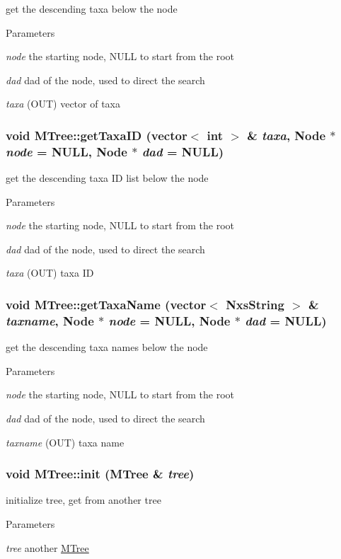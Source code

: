 get the descending taxa below the node 
\begin{DoxyParams}{Parameters}
\item[{\em node}]the starting node, NULL to start from the root \item[{\em dad}]dad of the node, used to direct the search \item[{\em taxa}](OUT) vector of taxa \end{DoxyParams}
\hypertarget{classMTree_ab0f71f4d94294490f3afe53873d394b5}{
\subsubsection[{getTaxaID}]{\setlength{\rightskip}{0pt plus 5cm}void MTree::getTaxaID (vector$<$ int $>$ \& {\em taxa}, \/  {\bf Node} $\ast$ {\em node} = {\ttfamily NULL}, \/  {\bf Node} $\ast$ {\em dad} = {\ttfamily NULL})}}
\label{classMTree_ab0f71f4d94294490f3afe53873d394b5}
get the descending taxa ID list below the node 
\begin{DoxyParams}{Parameters}
\item[{\em node}]the starting node, NULL to start from the root \item[{\em dad}]dad of the node, used to direct the search \item[{\em taxa}](OUT) taxa ID \end{DoxyParams}
\hypertarget{classMTree_a7552f9cfb570e529ba25a4d6f223ea16}{
\subsubsection[{getTaxaName}]{\setlength{\rightskip}{0pt plus 5cm}void MTree::getTaxaName (vector$<$ {\bf NxsString} $>$ \& {\em taxname}, \/  {\bf Node} $\ast$ {\em node} = {\ttfamily NULL}, \/  {\bf Node} $\ast$ {\em dad} = {\ttfamily NULL})}}
\label{classMTree_a7552f9cfb570e529ba25a4d6f223ea16}
get the descending taxa names below the node 
\begin{DoxyParams}{Parameters}
\item[{\em node}]the starting node, NULL to start from the root \item[{\em dad}]dad of the node, used to direct the search \item[{\em taxname}](OUT) taxa name \end{DoxyParams}
\hypertarget{classMTree_ad7da0ad44a31e8e98262bd7ad0f494ab}{
\subsubsection[{init}]{\setlength{\rightskip}{0pt plus 5cm}void MTree::init ({\bf MTree} \& {\em tree})}}
\label{classMTree_ad7da0ad44a31e8e98262bd7ad0f494ab}
initialize tree, get from another tree 
\begin{DoxyParams}{Parameters}
\item[{\em tree}]another \hyperlink{classMTree}{MTree} \end{DoxyParams}


